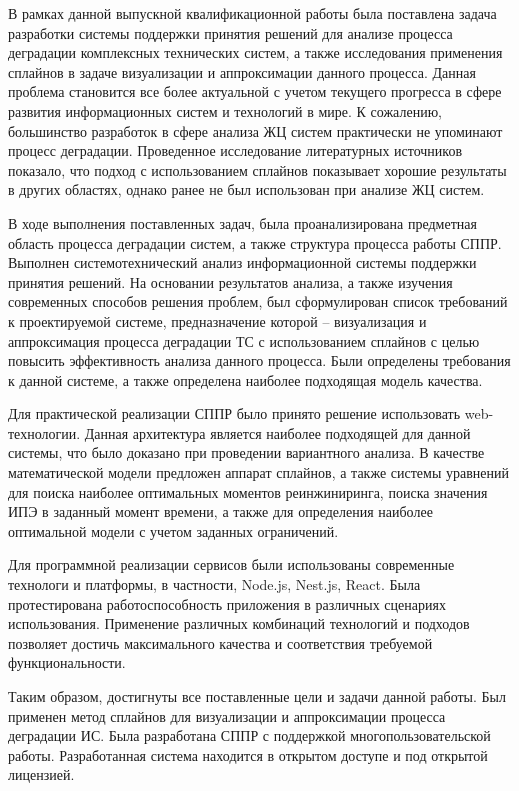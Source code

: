 
В рамках данной выпускной квалификационной работы была поставлена задача разработки системы поддержки принятия решений для анализе процесса деградации комплексных технических систем, а также исследования применения сплайнов в задаче визуализации и аппроксимации данного процесса. 
Данная проблема становится все более актуальной с учетом текущего прогресса в сфере развития информационных систем и технологий в мире. 
К сожалению, большинство разработок в сфере анализа ЖЦ систем практически не упоминают процесс деградации. 
Проведенное исследование литературных источников показало, что подход с использованием сплайнов показывает хорошие результаты в других областях, однако ранее не был использован при анализе ЖЦ систем. 

В ходе выполнения поставленных задач, была проанализирована предметная область процесса деградации систем, а также структура процесса работы СППР. 
Выполнен системотехнический анализ информационной системы поддержки принятия решений.
На основании результатов анализа, а также изучения современных способов решения проблем, был сформулирован список требований к проектируемой системе, предназначение которой – визуализация и аппроксимация процесса деградации ТС с использованием сплайнов с целью повысить эффективность анализа данного процесса. 
Были определены требования к данной системе, а также определена наиболее подходящая модель качества.

Для практической реализации СППР было принято решение использовать web-технологии. 
Данная архитектура является наиболее подходящей для данной системы, что было доказано при проведении вариантного анализа. 
В качестве математической модели предложен аппарат сплайнов, а также системы уравнений для поиска наиболее оптимальных моментов реинжиниринга, поиска значения ИПЭ в заданный момент времени, а также для определения наиболее оптимальной модели с учетом заданных ограничений.

Для программной реализации сервисов были использованы современные технологи и платформы, в частности, Node.js, Nest.js, React. 
Была протестирована работоспособность приложения в различных сценариях использования.
Применение различных комбинаций технологий и подходов позволяет достичь максимального качества и соответствия требуемой функциональности.

Таким образом, достигнуты все поставленные цели и задачи данной работы. 
Был применен метод сплайнов для визуализации и аппроксимации процесса деградации ИС. 
Была разработана СППР с поддержкой многопользовательской работы. 
Разработанная система находится в открытом доступе и под открытой лицензией.

